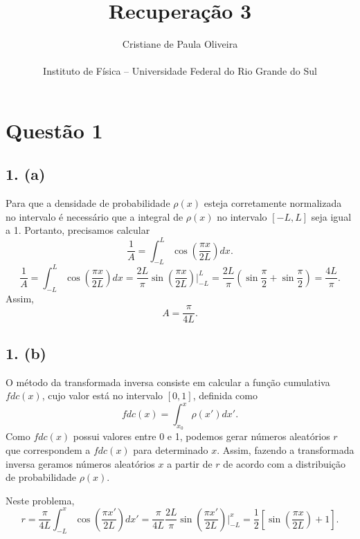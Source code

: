 \documentclass[brazilian, 12pt, a4paper, final]{article}
\title{\textbf{Recuperação 3}}
\author{Cristiane de Paula Oliveira\\\\\small{Instituto de Física -- Universidade Federal do Rio Grande do Sul}}
\begin{document}
\maketitle

\section*{Questão 1}
\subsection*{1. (a)}
Para que a densidade de probabilidade $\rho(x)$ esteja corretamente normalizada no intervalo é necessário que a integral de $\rho(x)$ no intervalo $[-L,L]$ seja  igual a 1.
Portanto, precisamos calcular
\begin{equation}
	\frac{1}{A}=\int_{-L}^{L}\cos\left(\frac{\pi x}{2L}\right)dx.
\end{equation}
\begin{equation*}
	\frac{1}{A}=\int_{-L}^{L}\cos\left(\frac{\pi x}{2L}\right)dx=\frac{2L}{\pi}\sin\left(\frac{\pi x}{2L}\right)\bigg\rvert_{-L}^{L}=\frac{2L}{\pi}\left(\sin\frac{\pi}{2}+\sin\frac{\pi}{2}\right)=\frac{4L}{\pi}.
\end{equation*}
Assim, 
\begin{equation}
A=\frac{\pi}{4L}.
\end{equation}

\subsection*{1. (b)}
O método da transformada inversa consiste em calcular a função cumulativa $fdc(x)$, cujo valor está no intervalo $[0,1]$, definida como
\begin{equation}
	fdc(	x)=\int_{x_0}^{x}\rho(x')dx'.
\end{equation}
Como $fdc(x)$ possui valores entre 0 e 1, podemos gerar números aleatórios $r$ que correspondem a $fdc(x)$ para determinado $x$. Assim, fazendo a transformada inversa geramos números aleatórios $x$ a partir de $r$ de acordo com a distribuição de probabilidade $\rho(x)$. 

Neste problema,
\begin{equation*}
	r=\frac{\pi}{4L}\int_{-L}^{x}\cos\left(\frac{\pi x'}{2L}\right)dx'=\frac{\pi}{4L}\frac{2L}{\pi}\sin\left(\frac{\pi x'}{2L}\right)\bigg\rvert_{-L}^{x}=\frac{1}{2}\left[\sin\left(\frac{\pi x}{2L}\right)+1 \right].
\end{equation*}
\end{document}
